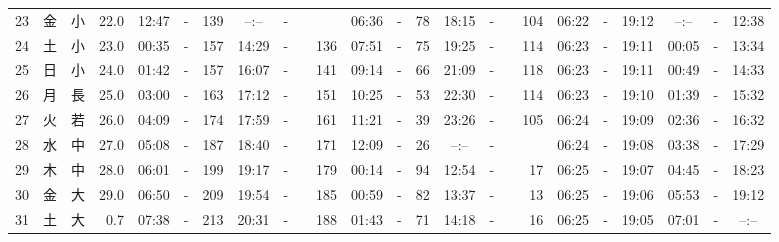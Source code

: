 \documentclass[12pt,a4j]{jsarticle}
\begin{document}
\begin{table}[htbp]
\begin{center}
{\begin{tabular}{|rc|cr|ccrccr|ccrccr|ccc|ccc|}
23 & 金 & 小 & 22.0 &  12:47 &-& 139 &  --:-- &-&~~~~~ &  06:36 &-&  78 &  18:15 &-& 104 & 06:22 & -& 19:12 & --:-- & -& 12:38 \\
24 & 土 & 小 & 23.0 &  00:35 &-& 157 &  14:29 &-& 136 &  07:51 &-&  75 &  19:25 &-& 114 & 06:23 & -& 19:11 & 00:05 & -& 13:34 \\
25 & 日 & 小 & 24.0 &  01:42 &-& 157 &  16:07 &-& 141 &  09:14 &-&  66 &  21:09 &-& 118 & 06:23 & -& 19:11 & 00:49 & -& 14:33 \\
26 & 月 & 長 & 25.0 &  03:00 &-& 163 &  17:12 &-& 151 &  10:25 &-&  53 &  22:30 &-& 114 & 06:23 & -& 19:10 & 01:39 & -& 15:32 \\
27 & 火 & 若 & 26.0 &  04:09 &-& 174 &  17:59 &-& 161 &  11:21 &-&  39 &  23:26 &-& 105 & 06:24 & -& 19:09 & 02:36 & -& 16:32 \\
28 & 水 & 中 & 27.0 &  05:08 &-& 187 &  18:40 &-& 171 &  12:09 &-&  26 &  --:-- &-&~~~~~ & 06:24 & -& 19:08 & 03:38 & -& 17:29 \\
29 & 木 & 中 & 28.0 &  06:01 &-& 199 &  19:17 &-& 179 &  00:14 &-&  94 &  12:54 &-&  17 & 06:25 & -& 19:07 & 04:45 & -& 18:23 \\
30 & 金 & 大 & 29.0 &  06:50 &-& 209 &  19:54 &-& 185 &  00:59 &-&  82 &  13:37 &-&  13 & 06:25 & -& 19:06 & 05:53 & -& 19:12 \\
31 & 土 & 大 &  0.7 &  07:38 &-& 213 &  20:31 &-& 188 &  01:43 &-&  71 &  14:18 &-&  16 & 06:25 & -& 19:05 & 07:01 & -& --:-- \\
   \hline
   \end{tabular}}
   \end{center}
\end{table}
\newpage
\end{document}
